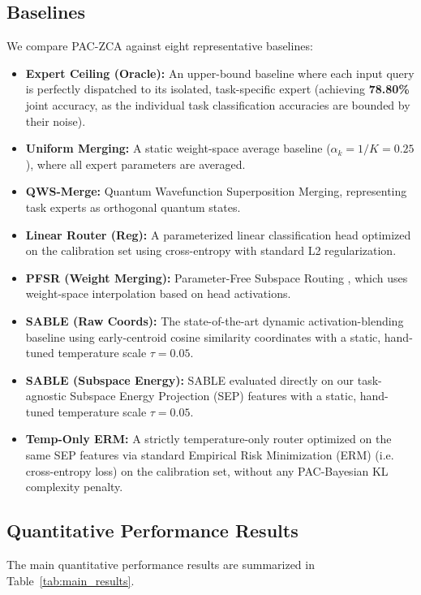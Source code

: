 \subsection{Baselines}
We compare PAC-ZCA against eight representative baselines:
\begin{itemize}
    \item \textbf{Expert Ceiling (Oracle):} An upper-bound baseline where each input query is perfectly dispatched to its isolated, task-specific expert (achieving \textbf{78.80\%} joint accuracy, as the individual task classification accuracies are bounded by their noise).
    \item \textbf{Uniform Merging:} A static weight-space average baseline ($\alpha_k = 1/K = 0.25$), where all expert parameters are averaged.
    \item \textbf{QWS-Merge:} Quantum Wavefunction Superposition Merging, representing task experts as orthogonal quantum states.
    \item \textbf{Linear Router (Reg):} A parameterized linear classification head optimized on the calibration set using cross-entropy with standard L2 regularization.
    \item \textbf{PFSR (Weight Merging):} Parameter-Free Subspace Routing \cite{pfsr2025}, which uses weight-space interpolation based on head activations.
    \item \textbf{SABLE (Raw Coords):} The state-of-the-art dynamic activation-blending baseline using early-centroid cosine similarity coordinates with a static, hand-tuned temperature scale $\tau = 0.05$.
    \item \textbf{SABLE (Subspace Energy):} SABLE evaluated directly on our task-agnostic Subspace Energy Projection (SEP) features with a static, hand-tuned temperature scale $\tau = 0.05$.
    \item \textbf{Temp-Only ERM:} A strictly temperature-only router optimized on the same SEP features via standard Empirical Risk Minimization (ERM) (i.e. cross-entropy loss) on the calibration set, without any PAC-Bayesian KL complexity penalty.
\end{itemize}

\subsection{Quantitative Performance Results}
The main quantitative performance results are summarized in Table~\ref{tab:main_results}.

